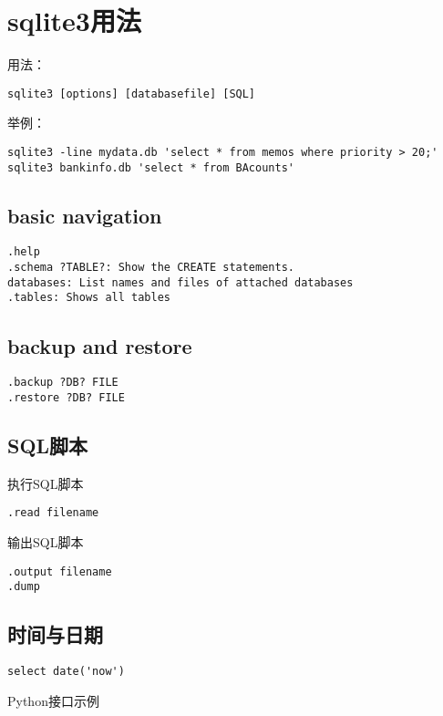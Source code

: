 \section{sqlite3用法}
用法：
\begin{verbatim}
sqlite3 [options] [databasefile] [SQL]
\end{verbatim}

举例：
\begin{verbatim}
sqlite3 -line mydata.db 'select * from memos where priority > 20;'
sqlite3 bankinfo.db 'select * from BAcounts'
\end{verbatim}

\subsection{basic navigation}
\begin{verbatim}
.help
.schema ?TABLE?: Show the CREATE statements.
databases: List names and files of attached databases
.tables: Shows all tables
\end{verbatim}

\subsection{backup and restore}
\begin{verbatim}
.backup ?DB? FILE
.restore ?DB? FILE 
\end{verbatim}

\subsection{SQL脚本}
执行SQL脚本
\begin{verbatim}
.read filename
\end{verbatim}

输出SQL脚本
\begin{verbatim}
.output filename 
.dump
\end{verbatim}

\subsection{时间与日期}

\begin{verbatim}
select date('now')
\end{verbatim}

Python接口示例

